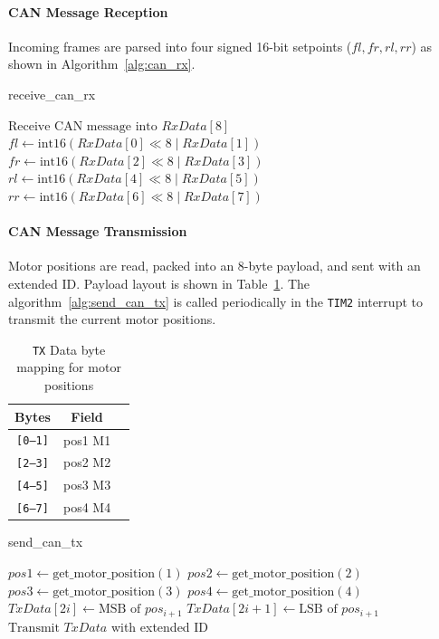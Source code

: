\paragraph*{CAN Message Reception}
Incoming frames are parsed into four signed 16-bit setpoints (\(fl,fr,rl,rr\)) as shown in Algorithm~\ref{alg:can_rx}.

\begin{algorithm}[H]
  \caption{receive\_can\_rx}
  \begin{algorithmic}[1]
    \State \(\text{Receive CAN message into }RxData[8]\)
    \State \(fl \gets \text{int16}(RxData[0]\ll8 \mid RxData[1])\)
    \State \(fr \gets \text{int16}(RxData[2]\ll8 \mid RxData[3])\)
    \State \(rl \gets \text{int16}(RxData[4]\ll8 \mid RxData[5])\)
    \State \(rr \gets \text{int16}(RxData[6]\ll8 \mid RxData[7])\)
    \EndFunction
  \end{algorithmic}
  \label{alg:can_rx}
\end{algorithm}

\paragraph*{CAN Message Transmission}
Motor positions are read, packed into an 8-byte payload, and sent with an extended ID. Payload layout is shown in Table~\ref{tab:can_txdata}. The algorithm~\ref{alg:send_can_tx} is called periodically in the \texttt{TIM2} interrupt to transmit the current motor positions.

\begin{table}[H]
  \centering
  \begin{tabular}{c|c|c}
    \hline
    Bytes           & Field   \\
    \hline
    \texttt{[0--1]} & pos1 M1 \\
    \texttt{[2--3]} & pos2 M2 \\
    \texttt{[4--5]} & pos3 M3 \\
    \texttt{[6--7]} & pos4 M4 \\
    \hline
  \end{tabular}
  \caption{\texttt{TX} Data byte mapping for motor positions}
  \label{tab:can_txdata}
\end{table}

\begin{algorithm}[H]
  \caption{send\_can\_tx}
  \begin{algorithmic}[1]
    \State \(pos1 \gets \text{get\_motor\_position}(1)\)
    \State \(pos2 \gets \text{get\_motor\_position}(2)\)
    \State \(pos3 \gets \text{get\_motor\_position}(3)\)
    \State \(pos4 \gets \text{get\_motor\_position}(4)\)
    \State \(TxData[2i]  \gets \text{MSB of }pos_{i+1}\)
    \State \(TxData[2i+1] \gets \text{LSB of }pos_{i+1}\)
    \EndFor
    \State \(\text{Transmit }TxData\) with extended ID
    \EndFunction
  \end{algorithmic}
  \label{alg:send_can_tx}
\end{algorithm}


